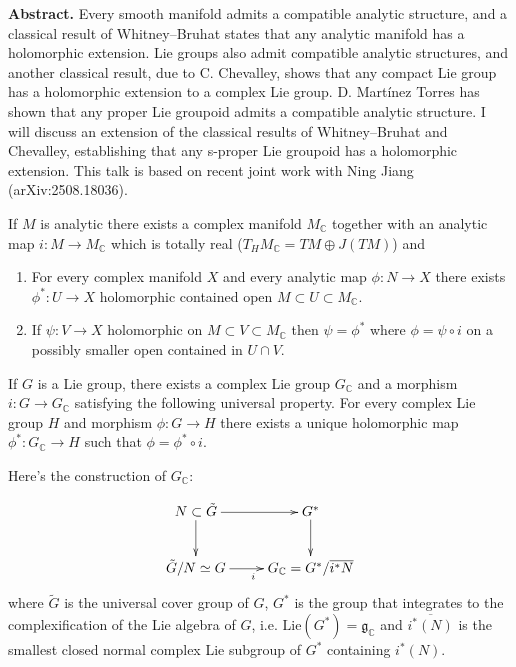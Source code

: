 \medskip\noindent
{\bf Abstract.} Every smooth manifold admits
a compatible analytic
structure, and a classical result of
Whitney–Bruhat states that any analytic
manifold has a holomorphic extension. Lie
groups also admit compatible analytic
structures, and another classical result, due
to C. Chevalley, shows that any
compact Lie group has a holomorphic extension
to a complex Lie group. D.
Martínez Torres has shown that any proper Lie
groupoid admits a compatible
analytic structure. I will discuss an
extension of the classical results of
Whitney–Bruhat and Chevalley, establishing
that any s-proper Lie groupoid has a
holomorphic extension. This talk is based on
recent joint work with Ning Jiang
(arXiv:2508.18036).

\medskip\noindent

\begin{theorem}
\label{theorem-Whitney-Beuhat}
If $M$ is analytic there exists a complex
manifold  $M_\mathbb{C}$
together with an analytic map $i: M \to
M_\mathbb{C}$
which is totally real ($T_HM_{\mathbb{C}}=TM
\oplus J(TM)$)
and
\begin{enumerate}
\item For every complex manifold $X$ and
every
analytic map $\phi:N \to X$ there exists
$\phi^*:U \to X$
holomorphic contained open $M \subset U
\subset M_\mathbb{C}$.
\item If $\psi:V \to X$ holomorphic on $M
\subset V \subset M_\mathbb{C}$ then
$\psi=\phi^*$ where $\phi=\psi \circ i$ on a
possibly
smaller open contained in $U \cap V$.
\end{enumerate}
\end{theorem}

\begin{theorem}[Chevalley]
\label{theorem-Chevalley}
If $G$ is a Lie group, there exists a complex
Lie group $G_{\mathbb{C}}$ and a morphism
$i:G \to G_\mathbb{C}$
satisfying the following universal property.
For every complex Lie group $H$ and morphism
$\phi:G \to H$ there exists a unique
holomorphic map $\phi^*:G_\mathbb{C} \to H$
such that
$\phi=\phi^* \circ i$.
\end{theorem}

Here's the construction of $G_\mathbb{C}$:

$$
\xymatrix{
N\subset \tilde{G}\ar[r]\ar[d]&G^*\ar[d]\\
\tilde{G}/N \simeq
G\ar[r]_{i}&G_\mathbb{C}=G^* /\overline{i^*N}
}
$$
where $\tilde{G}$ is the universal cover
group of $G$,
 $G^*$ is the group that integrates to
the complexification of the Lie algebra of
$G$,
i.e.
$\text{Lie}(G^*)=\mathfrak{g}_\mathbb{C}$
and $\overline{i^*(N)}$ is the smallest
closed
normal complex Lie subgroup of $G^*$
containing $i^*(N)$.

